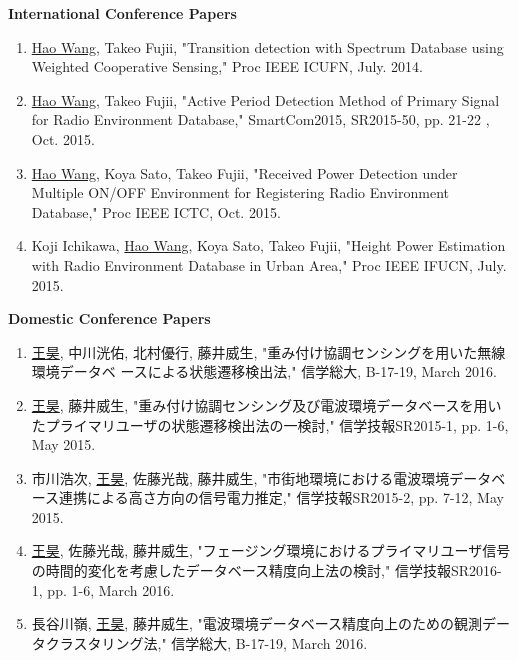 \begin{publication}
{\bf International Conference Papers}
  \begin{enumerate}[{}i{.}]
  
      \item \underline{Hao Wang}, Takeo Fujii, "Transition detection with Spectrum Database using Weighted Cooperative Sensing," Proc IEEE ICUFN, July. 2014.
 
      \item \underline{Hao Wang}, Takeo Fujii, "Active Period Detection Method of Primary Signal for Radio Environment Database," SmartCom2015, SR2015-50, pp. 21-22 , Oct. 2015.
      \item \underline{Hao Wang}, Koya Sato, Takeo Fujii, "Received Power Detection under Multiple ON/OFF Environment for Registering Radio Environment Database," Proc IEEE ICTC, Oct. 2015.
 
      \item Koji Ichikawa, \underline{Hao Wang}, Koya Sato, Takeo Fujii, "Height Power Estimation with Radio Environment Database in Urban Area," Proc IEEE IFUCN, July. 2015.
   \end{enumerate}
{\bf Domestic Conference Papers}
    \begin{enumerate}[{}i{.}]
        \item \underline{王昊}, 中川洸佑, 北村優行, 藤井威生, "重み付け協調センシングを用いた無線環境データベ ースによる状態遷移検出法," 信学総大, B-17-19, March 2016.
         \item \underline{王昊}, 藤井威生, "重み付け協調センシング及び電波環境データベースを用いたプライマリユーザの状態遷移検出法の一検討," 信学技報SR2015-1, pp. 1-6, May 2015.
         \item 市川浩次, \underline{王昊}, 佐藤光哉, 藤井威生, "市街地環境における電波環境データベース連携による高さ方向の信号電力推定," 信学技報SR2015-2, pp. 7-12, May 2015.
         \item \underline{王昊}, 佐藤光哉, 藤井威生, "フェージング環境におけるプライマリユーザ信号の時間的変化を考慮したデータベース精度向上法の検討," 信学技報SR2016-1, pp. 1-6, March 2016.
         \item 長谷川嶺, \underline{王昊}, 藤井威生, "電波環境データベース精度向上のための観測データクラスタリング法," 信学総大, B-17-19, March 2016.
    \end{enumerate}

\end{publication}
